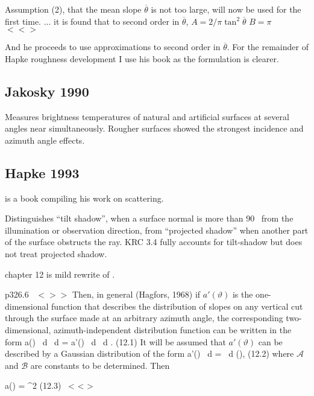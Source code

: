 \documentclass{article}
\newcommand{\qeq}{\hspace{25.mm}} %
\newcommand{\bq}{$ < \! > \!   \! >$ } %
\newcommand{\eq}{ $< \! \! < \! > $ } %
\newcommand{\eqq}{ \ < \! \! < \! > \ } %
\begin{document}
Assumption (2), that the mean slope $ \overline{\theta}$ is not too large, will
now be used for the first time.  ... it is found that to second order in $ \overline{\theta}$,  
\qi $A=2/\pi \tan^2 \overline{\theta} $
\qi $B=\pi$  \ \  \eq

 And he proceeds to use approximations to second order in
 $\overline{\theta}$. For the remainder of Hapke roughness development I use his
 book as the formulation is clearer.

\subsection{Jakosky 1990} %
 Measures brightness temperatures of natural and artificial
surfaces at several angles near simultaneously. Rougher surfaces showed the
strongest incidence and azimuth angle effects.

\subsection{Hapke 1993} %
   is a book compiling his work on scattering. 

Distinguishes ``tilt shadow'', when a surface normal is more than 90\qd~ from
the illumination or observation direction, from ``projected shadow'' when
another part of the surface obstructs the ray.  KRC 3.4 fully accounts for
tilt-shadow but does not treat projected shadow.

  chapter 12 is mild rewrite of .

p326.6 \ \bq Then, in general (Hagfors, 1968) if $a'(\vartheta)$ is the
one-dimensional function that describes the distribution of slopes on any
vertical cut through the surface made at an arbitrary azimuth angle, the
corresponding two-dimensional, azimuth-independent distribution function can be
written in the form 
\qb a(\vartheta) \ d \vartheta \ d \zeta 
= a'(\vartheta) \sin \vartheta \ d \vartheta \ d \zeta. \qeq (12.1) \qe
It will be assumed that $a'(\vartheta)$ can be described by a Gaussian
 distribution of the form
\qb a'(\vartheta ) \ d \vartheta  =  \exp {} \ d (\tan \vartheta), \qeq (12.2) \qe
 where $\mathcal{A}$ and $\mathcal{B}$ are constants to be determined. Then

\qb a(\vartheta ) = \exp {}
\sec^2 \vartheta  \sin \vartheta \qeq (12.3) \eqq \qe
\end{document}

